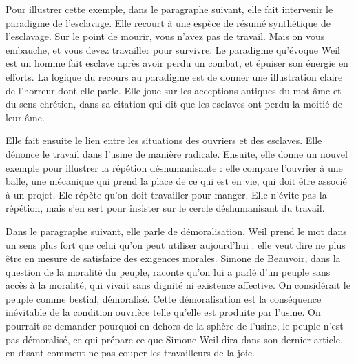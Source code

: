 \documentclass[a4paper,12pt]{book}
\begin{document}
\par Pour illustrer cette exemple, dans le paragraphe suivant, elle fait intervenir le paradigme de l'esclavage. Elle recourt à une espèce de résumé synthétique de l'esclavage. Sur le point de mourir, vous n'avez pas de travail. Mais on vous embauche, et vous devez travailler pour survivre. Le paradigme qu'évoque Weil est un homme fait esclave après avoir perdu un combat, et épuiser son énergie en efforts. La logique du recours au paradigme est de donner une illustration claire de l'horreur dont elle parle. Elle joue sur les acceptions antiques du mot âme et du sens chrétien, dans sa citation qui dit que les esclaves ont perdu la moitié de leur âme.
\par Elle fait ensuite le lien entre les situations des ouvriers et des esclaves. Elle dénonce le travail dans l'usine de manière radicale. Ensuite, elle donne un nouvel exemple pour illustrer la répétion déshumanisante : elle compare l'ouvrier à une balle, une mécanique qui prend la place de ce qui est en vie, qui doit être associé à un projet. Ele répète qu'on doit travailler pour manger. Elle n'évite pas la répétion, mais s'en sert pour insister sur le cercle déshumanisant du travail.
\par Dans le paragraphe suivant, elle parle de démoralisation. Weil prend le mot dans un sens plus fort que celui qu'on peut utiliser aujourd'hui : elle veut dire ne plus être en mesure de satisfaire des exigences morales. Simone de Beauvoir, dans la question de la moralité du peuple, raconte qu'on lui a parlé d'un peuple sans accès à la moralité, qui vivait sans dignité ni existence affective. On considérait le peuple comme bestial, démoralisé. Cette démoralisation est la conséquence inévitable de la condition ouvrière telle qu'elle est produite par l'usine. On pourrait se demander pourquoi en-dehors de la sphère de l'usine, le peuple n'est pas démoralisé, ce qui prépare ce que Simone Weil dira dans son dernier article, en disant comment ne pas couper les travailleurs de la joie.
\end{document}

